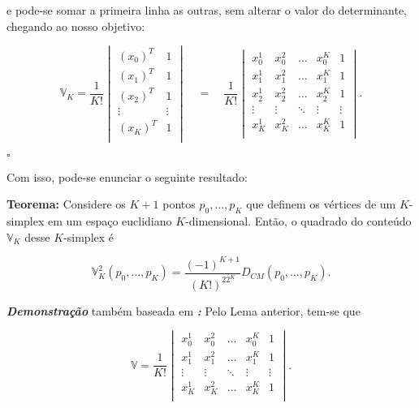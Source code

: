 e pode-se somar a primeira linha as outras, sem alterar o valor do determinante, chegando ao nosso objetivo:

$$\mathbb{V}_K = \frac{1}{K!}\begin{vmatrix}
(x_0)^T & 1\\
(x_1)^T & 1\\
(x_2)^T & 1\\
\vdots & \vdots\\
(x_K)^T & 1\\
\end{vmatrix} \quad = \quad \frac{1}{K!} 
\begin{vmatrix}
x_0^1 & x^2_{0} & \ldots & x^K_{0} & 1\\ 
x^1_{1} & x^2_1 & \ldots & x^K_{1} & 1\\ 
x^1_{2} & x^2_2 & \ldots & x^K_{2} & 1\\ 
\vdots & \vdots & \ddots & \vdots & \vdots\\ 
x^1_{K} & x^2_{K} & \ldots & x_K^K & 1\\ 
\end{vmatrix}.$$

\begin{flushright}
	$\square$
\end{flushright}

Com isso, pode-se enunciar o seguinte resultado:
\begin{center}
	\begin{minipage}{0.9 \linewidth}
		\textbf{Teorema:} Considere os $K+1$ pontos $p_0, \dots, p_K$ que definem os vértices de um $K$-simplex em um espaço euclidiano $K$-dimensional. Então, o quadrado do conteúdo $\mathbb{V}_K$ desse $K$-simplex é
	\end{minipage}
\end{center} 

\begin{equation}
\mathbb{V}_K^2(p_0, \dots, p_K) = \frac{(-1)^{K+1}}{(K!)^22^K} D_{CM}(p_0, \dots, p_K).
\label{eq:volumeKdimensionalNSimplex}
\end{equation}

\textit{\textbf{Demonstração}} também baseada em \cite{douglasGD}\textit{\textbf{:}} Pelo Lema anterior, tem-se que 

$$\mathbb{V} = \frac{1}{K!} 
\begin{vmatrix}
x_0^1 & x^2_{0} & \ldots & x^K_{0} & 1\\ 
x^1_{1} & x^2_1 & \ldots & x^K_{1} & 1\\ 
\vdots & \vdots & \ddots & \vdots & \vdots\\ 
x^1_{K} & x^2_{K} & \ldots & x_K^K & 1\\ 
\end{vmatrix}.
$$

